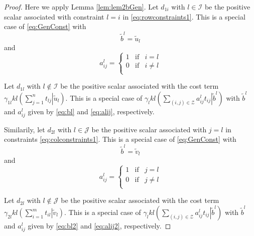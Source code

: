 \documentclass[twocolumn]{article}
\begin{document}
 \begin{proof}  
 
Here we apply  Lemma \ref{lem:lem2bGen}.
Let $d_{1i}$ with $l\in \mathcal{I}$ 
be the positive scalar associated with   constraint $l=i$ in \eqref{eq:rowconstraints1}.
This is a special case of \eqref{eq:GenConst} with
\begin{equation}
\label{eq:bl}
\tilde{b}^l = \tilde{u}_l
\end{equation}
and
\begin{equation}
\label{eq:alij}
a^l_{ij} = \left\{ \begin{array}{rcl}
1 &\text{if} & i=l  \\
0 &\text{if} & i \neq l  \\
\end{array} \right.
\end{equation}

Let $d_{1l}$ with $l \notin \mathcal{I}$ 
be the positive scalar associated with the cost term
$\gamma_{1l} kl\left(\left. \sum_{j=1}^n  t_{lj} \right| \tilde{u}_l\right)$.
This is a special case of 
$\gamma_l kl\left( \sum_{(i,j) \in {\mathcal Z}} 
\left. a^l_{ij} t_{ij}\right|\tilde{b}^l  \right)$
with
$\tilde{b}^l$ and $a^l_{ij}$ given by \eqref{eq:bl} and \eqref{eq:alij}, respectively.

Similarily, let  $d_{2l}$ with $l\in \mathcal{J}$ 
be  the positive scalar associated with $j=l$ in constraints  \eqref{eq:colconstraints1}.
This is a special case of \eqref{eq:GenConst} with
\begin{equation}
\label{eq:bl2}
\tilde{b}^l = \tilde{v}_l
\end{equation}
and
\begin{equation}
\label{eq:alij2}
a^l_{ij} = \left\{ \begin{array}{rcl}
1 &\text{if} & j=l  \\
0 &\text{if} & j \neq l  \\
\end{array} \right.
\end{equation}



Let $d_{2l}$ with $l\notin \mathcal{J}$ 
be the positive scalar associated with the cost term
$\gamma_{2l} kl\left(\left. \sum_{i=1}^m  t_{il} \right| \tilde{v}_l\right)$.
This is a special case of 
$\gamma_l kl\left( \sum_{(i,j) \in {\mathcal Z}} 
\left. a^l_{ij} t_{ij}\right|\tilde{b}^l  \right)$
with
$\tilde{b}^l$ and $a^l_{ij}$ given by \eqref{eq:bl2} and \eqref{eq:alij2}, respectively.


\end{proof}
\end{document}
